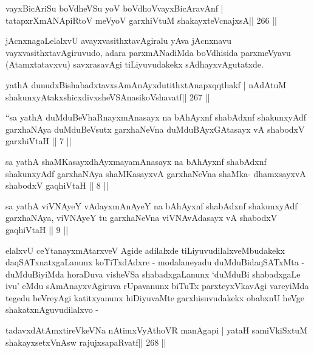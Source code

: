 \begin{shl}
vayxBicAriSu boVdheVSu yoV boVdhoV\s vayxBicAravAnf |
tatapxrXmANApiRtoV meVyoV garxhiVtuM shakayxteV\s cnajxsA\hfill || 266 ||
\end{shl}

\begin{artha}
jAcnxnagaLelalxvU avayxvasithxtavAgiralu yAva jAcnxnavu vayxvasithxtavAgiruvudo, adara parxmANadiMda boVdhisida parxmeVyavu (Atamxtatavxvu) savxrasavAgi tiLiyuvudakekx sAdhayxvAgutatxde.
\end{artha}


\begin{shl}
yathA dunudxBishabadxtavxsAmAnAyxdutithxtAnapxqqthakf |
nA\s\s dAtuM shakunxyAtakxshicxdivxsheVSAnasikoVshavatf\hfill || 267 ||
\end{shl}



\begin{kandikeshl}
``sa yathA duMduBeVhaRnayxmAnasayx na bAhAyxnf shabAdxnf
shakunxyAdf garxhaNAya duMduBeVsutx garxhaNeVna
duMduBAyxGAtasayx vA shabodxV garxhiVtaH || 7 ||
\end{kandikeshl}

\begin{kandikeshl}
sa yathA shaMKasayxdhAyxmayamAnasayx na bAhAyxnf shabAdxnf
shakunxyAdf garxhaNAya shaMKasayxvA garxhaNeVna shaMka-
dhamxsayxvA shabodxV gaqhiVtaH || 8 ||
\end{kandikeshl}

\begin{kandikeshl}
sa yathA viVNAyeY vAdayxmAnAyeY na bAhAyxnf
shabAdxnf shakunxyAdf garxhaNAya, viVNAyeY tu garxhaNeVna
viVNAvAdasayx vA shabodxV gaqhiVtaH || 9 ||
\end{kandikeshl}

\begin{artha}
elalxvU ceYtanayxmAtarxveV Agide adilalxde tiLiyuvudilalxveMbudakekx daqSATxnatxgaLanunx koTiTxdAdxre - modalaneyadu duMduBidaqSATxMta - duMduBiyiMda horaDuva visheVSa shabadxgaLanunx `duMduBi shabadxgaLe ivu' eMdu sAmAnayxvAgiruva rUpavanunx biTuTx parxteyxVkavAgi vareyiMda tegedu beVreyAgi katitxyanunx hiDiyuvaMte garxhisuvudakekx obabxnU heVge shakatxnAguvudilalxvo -
\end{artha}

\begin{shl}
tadavxdAtAmxtireVkeVNa nA\s\s timxVyAthoVR manAgapi |
yataH samiVkiSxtuM shakayxsetxVnAsw rajujxsapaRvatf\hfill || 268 ||
\end{shl}

